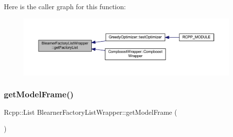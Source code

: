 Here is the caller graph for this function\+:\nopagebreak
\begin{figure}[H]
\begin{center}
\leavevmode
\includegraphics[width=350pt]{class_blearner_factory_list_wrapper_a985fa4f35e74e44cd91567fb14d575ab_icgraph}
\end{center}
\end{figure}
\mbox{\label{class_blearner_factory_list_wrapper_ae6cfdabc3dfe85a90a1c6eb5620edeb9}} 
\subsubsection{\texorpdfstring{get\+Model\+Frame()}{getModelFrame()}}
{\footnotesize\ttfamily Rcpp\+::\+List Blearner\+Factory\+List\+Wrapper\+::get\+Model\+Frame (\begin{DoxyParamCaption}{ }\end{DoxyParamCaption})\hspace{0.3cm}{\ttfamily [inline]}}

